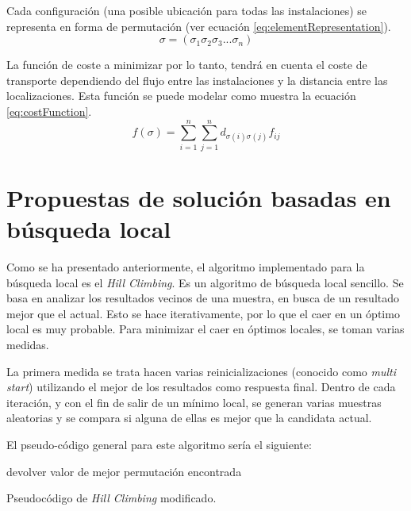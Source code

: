 \documentclass[10pt,a4paper]{article}
\begin{document}
Cada configuración (una posible ubicación para todas las instalaciones) se representa en forma de permutación (ver ecuación \ref{eq:elementRepresentation}).
\begin{equation}
\sigma = (\sigma_1\sigma_2\sigma_3...\sigma_n)
\label{eq:elementRepresentation}
\end{equation}

La función de coste a minimizar por lo tanto, tendrá en cuenta el coste de transporte dependiendo del flujo entre las instalaciones y la distancia entre las localizaciones. Esta función se puede modelar como muestra la ecuación \ref{eq:costFunction}.
\begin{equation}
f(\sigma)=\sum^n_{i=1}\sum^n_{j=1}d_{\sigma(i)\sigma(j)}f_{ij}
\label{eq:costFunction}
\end{equation}

\section{Propuestas de solución basadas en búsqueda local}
Como se ha presentado anteriormente, el algoritmo implementado para la búsqueda local es el \textit{Hill Climbing}. Es un algoritmo de búsqueda local sencillo. Se basa en analizar los resultados vecinos de una muestra, en busca de un resultado mejor que el actual. Esto se hace iterativamente, por lo que el caer en un óptimo local es muy probable. Para minimizar el caer en óptimos locales, se toman varias medidas.

La primera medida se trata hacen varias reinicializaciones (conocido como \textit{multi start}) utilizando el mejor de los resultados como respuesta final. Dentro de cada iteración, y con el fin de salir de un mínimo local, se generan varias muestras aleatorias y se compara si alguna de ellas es mejor que la candidata actual.

El pseudo-código general para este algoritmo sería el siguiente:

\begin{algorithm}[H]
 devolver valor de mejor permutación encontrada
 \caption{Pseudocódigo de \textit{Hill Climbing} modificado.}
\end{algorithm}
\end{document}
